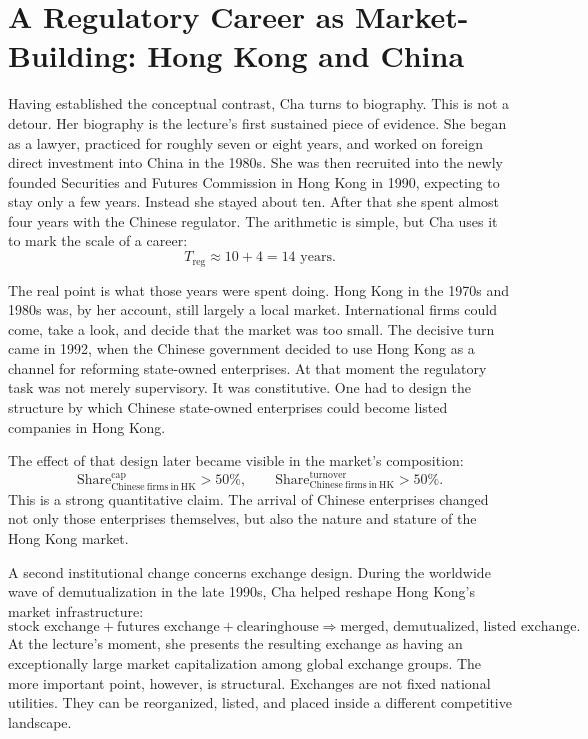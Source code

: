 \section{A Regulatory Career as Market-Building: Hong Kong and China}

Having established the conceptual contrast, Cha turns to biography. This is not a detour. Her biography is the lecture's first sustained piece of evidence. She began as a lawyer, practiced for roughly seven or eight years, and worked on foreign direct investment into China in the 1980s. She was then recruited into the newly founded Securities and Futures Commission in Hong Kong in 1990, expecting to stay only a few years. Instead she stayed about ten. After that she spent almost four years with the Chinese regulator. The arithmetic is simple, but Cha uses it to mark the scale of a career:
\begin{equation}
T_{\mathrm{reg}} \approx 10 + 4 = 14 \text{ years.}
\end{equation}

The real point is what those years were spent doing. Hong Kong in the 1970s and 1980s was, by her account, still largely a local market. International firms could come, take a look, and decide that the market was too small. The decisive turn came in 1992, when the Chinese government decided to use Hong Kong as a channel for reforming state-owned enterprises. At that moment the regulatory task was not merely supervisory. It was constitutive. One had to design the structure by which Chinese state-owned enterprises could become listed companies in Hong Kong.

The effect of that design later became visible in the market's composition:
\begin{equation}
\mathrm{Share}^{\mathrm{cap}}_{\mathrm{Chinese\ firms\ in\ HK}} > 50\%,
\qquad
\mathrm{Share}^{\mathrm{turnover}}_{\mathrm{Chinese\ firms\ in\ HK}} > 50\%.
\end{equation}
This is a strong quantitative claim. The arrival of Chinese enterprises changed not only those enterprises themselves, but also the nature and stature of the Hong Kong market.

A second institutional change concerns exchange design. During the worldwide wave of demutualization in the late 1990s, Cha helped reshape Hong Kong's market infrastructure:
\begin{equation}
\text{stock exchange}
+
\text{futures exchange}
+
\text{clearinghouse}
\Rightarrow
\text{merged, demutualized, listed exchange}.
\end{equation}
At the lecture's moment, she presents the resulting exchange as having an exceptionally large market capitalization among global exchange groups. The more important point, however, is structural. Exchanges are not fixed national utilities. They can be reorganized, listed, and placed inside a different competitive landscape.

